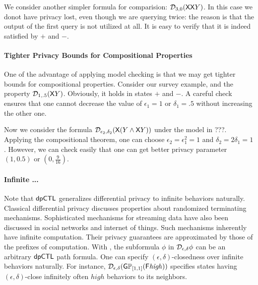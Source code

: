 We consider another simpler formula for comparision: $\mathcal{D}_{{3}, {0}} (\mathsf{X} \mathsf{X} Y)$. In this case we donot have privacy lost, even though we are querying twice: the reason is that the output of the first query is not utilized at all. It is easy to verify that it is indeed satisfied by $+$ and $-$.

\paragraph{Tighter Privacy Bounds for Compositional Properties}
One of the advantage of applying model checking is that we may get tighter bounds for compositional properties. Consider our survey example, and the property $\mathcal{D}_{{1}, {.5}} (\mathsf{X} Y)$. Obviously, it holds in states $+$ and $-$. A careful check ensures that one cannot decrease the value of $\epsilon_1=1$ or $\delta_1=.5$ without increasing the other one.


Now we consider the formula $\mathcal{D}_{{\epsilon_2}, {\delta_2}} (\mathsf{X} (Y\wedge \mathsf{X} Y))$ under the model in ???. Applying the compositional theorem, one can choose $\epsilon_2=\epsilon_1^2=1$ and $\delta_2=2\delta_1=1$. However, we can check easily that one can get better privacy parameter $(1,0.5)$ or $(0,\frac{9}{16})$.


\paragraph{Infinite ...}
Note that $\textsf{dpCTL}$ generalizes differential privacy to infinite
behaviors naturally. Classical differential privacy discusses properties about
randomized terminating mechanisms. Sophisticated mechanisms for
streaming data have also been discussed in social networks and
internet of things. Such mechanisms inherently have infinite
computation. Their privacy guarantees are approximated by those of the
prefixes of computation.
With \dpCTL, the subformula $\phi$ in $\mathcal{D}_{{\epsilon}, {\delta}} \phi$
can be an arbitrary $\textsf{dpCTL}$ path formula. One can specify
$(\epsilon, \delta)$-closedness over infinite behaviors naturally. For instance,
$\mathcal{D}_{{\epsilon}, {\delta}} (\mathsf{G} \mathbb{P}_{[1,1]} (\mathsf{F} \mathit{high}))$ 
specifies states having $(\epsilon, \delta)$-close
infinitely often $\mathit{high}$ behaviors to its neighbors.
